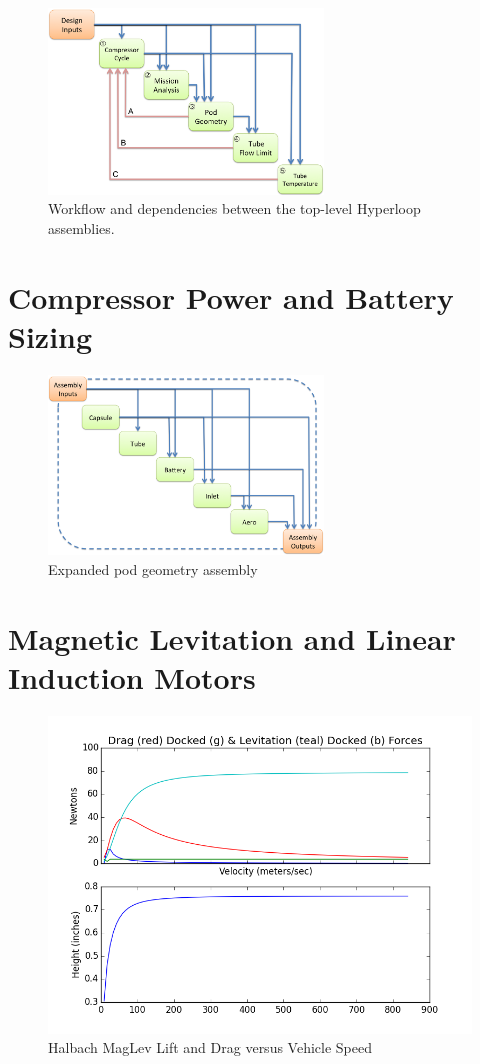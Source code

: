 \documentclass[heading.tex]{subfiles}
\begin{document}
	\begin{figure}[hbtp]
		\centering
		\includegraphics[width=0.65\textwidth]{images/TopAssembly.png}
		\caption{Workflow and dependencies between the top-level Hyperloop assemblies.}
		\label{f:hyperloopXDSM}
	\end{figure}

\section{Compressor Power and Battery Sizing}

	\begin{figure}[hbtp]
		\centering
		\includegraphics[width=0.65\textwidth]{images/podAssembly.png}
		\caption{Expanded pod geometry assembly}
		\label{f:podXDSM}
	\end{figure}

\section{Magnetic Levitation and Linear Induction Motors}

	\begin{figure}[hbtp]
		\centering
		\includegraphics[width=.75\textwidth]{images/halbach0.png}
		\caption[h0]{Halbach MagLev Lift and Drag versus Vehicle Speed}
		\label{f:h0}
	\end{figure}
\end{document}

